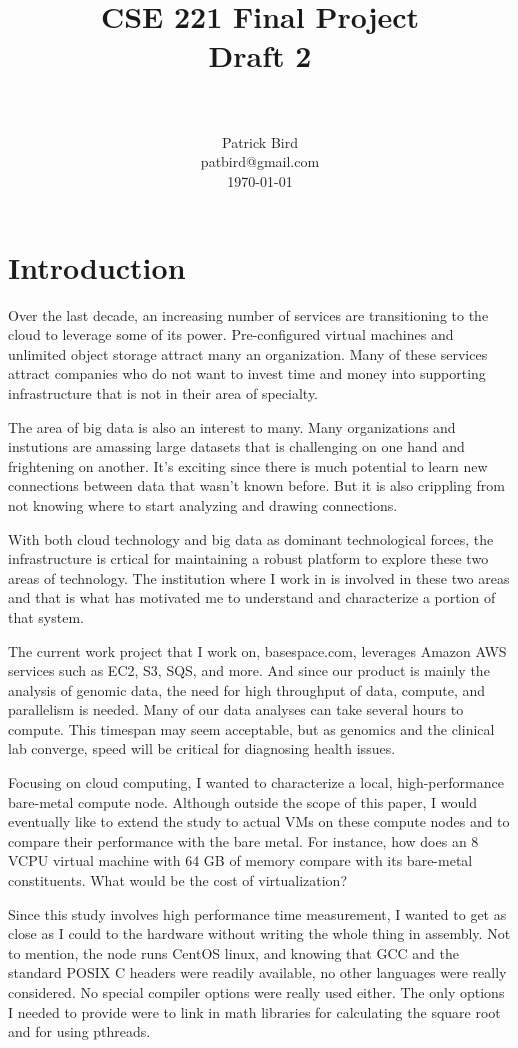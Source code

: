 \documentclass[paper=a4, fontsize=11pt]{scrartcl}
\title{
        \usefont{OT1}{bch}{b}{n}
        \normalfont \normalsize \textsc{} \\ [25pt]
        \horrule{0.5pt} \\[0.4cm]
        \huge CSE 221 Final Project \\
        \huge       Draft 2         \\
        \horrule{2pt} \\[0.5cm]
}
\author{
        \normalfont                                 \normalsize
        Patrick Bird\\[-3pt]        \normalsize
        patbird@gmail.com\\           \normalsize
        \today
}
\date{}
\numberwithin{equation}{section}        %
\numberwithin{figure}{section}          %
\numberwithin{table}{section}               %
\begin{document}
\maketitle
\section{Introduction}
Over the last decade, an increasing number of services are transitioning to the cloud to leverage some of its power.  Pre-configured virtual machines and unlimited object storage attract many an organization.  Many of these services attract companies who do not want to invest time and money into supporting infrastructure that is not in their area of specialty.

The area of big data is also an interest to many.  Many organizations and instutions are amassing large datasets that is challenging on one hand and frightening on another.  It's exciting since there is much potential to learn new connections between data that wasn't known before.  But it is also crippling from not knowing where to start analyzing and drawing connections.

With both cloud technology and big data as dominant technological forces, the infrastructure is crtical for maintaining a robust platform to explore these two areas of technology.  The institution where I work in is involved in these two areas and that is what has motivated me to understand and characterize a portion of that system.

The current work project that I work on, basespace.com, leverages Amazon AWS services such as EC2, S3, SQS, and more.  And since our product is mainly the analysis of genomic data, the need for high throughput of data, compute, and parallelism is needed.  Many of our data analyses can take several hours to compute.  This timespan may seem acceptable, but as genomics and the clinical lab converge, speed will be critical for diagnosing health issues.

Focusing on cloud computing, I wanted to characterize a local, high-performance bare-metal compute node.  Although outside the scope of this paper, I would eventually like to extend the study to actual VMs on these compute nodes and to compare their performance with the bare metal.  For instance, how does an 8 VCPU virtual machine with 64 GB of memory compare with its bare-metal constituents.  What would be the cost of virtualization?

Since this study involves high performance time measurement, I wanted to get as close as I could to the hardware without writing the whole thing in assembly.  Not to mention, the node runs CentOS linux, and knowing that GCC and the standard POSIX C headers were readily available, no other languages were really considered.  No special compiler options were really used either.  The only options I needed to provide were to link in math libraries for calculating the square root and for using pthreads.
\end{document}
